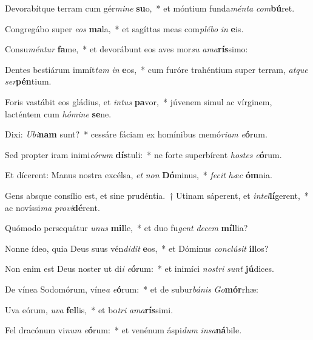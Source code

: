 \item Devorabítque terram cum gér\textit{mi}\textit{ne} \textbf{su}o,~* et móntium funda\textit{mén}\textit{ta} \textit{com}\textbf{bú}ret.
\item Congregábo super \textit{e}\textit{os} \textbf{ma}la,~* et sagíttas meas com\textit{plé}\textit{bo} \textit{in} \textbf{e}is.
\item Consu\textit{mén}\textit{tur} \textbf{fa}me,~* et devorábunt eos aves mor\textit{su} \textit{a}\textit{ma}\textbf{rís}simo:
\item Dentes bestiárum immít\textit{tam} \textit{in} \textbf{e}os,~* cum furóre trahéntium super terram, \textit{at}\textit{que} \textit{ser}\textbf{pén}tium.
\item Foris vastábit eos gládius, et \textit{in}\textit{tus} \textbf{pa}vor,~* júvenem simul ac vírginem, lacténtem cum \textit{hó}\textit{mi}\textit{ne} \textbf{se}ne.
\item Dixi: \textit{U}\textit{bi}\textbf{nam} sunt?~* cessáre fáciam ex homínibus memó\textit{ri}\textit{am} \textit{e}\textbf{ó}rum.
\item Sed propter iram inimi\textit{có}\textit{rum} \textbf{dís}tuli:~* ne forte superbírent \textit{hos}\textit{tes} \textit{e}\textbf{ó}rum.
\item Et dícerent: Manus nostra excélsa, \textit{et} \textit{non} \textbf{Dó}minus,~* \textit{fe}\textit{cit} \textit{hæc} \textbf{óm}nia.
\item Gens absque consílio est, et sine prudéntia.~† Utinam sáperent, et \textit{in}\textit{tel}\textbf{lí}gerent,~* ac novíssi\textit{ma} \textit{pro}\textit{vi}\textbf{dé}rent.
\item Quómodo persequátur \textit{u}\textit{nus} \textbf{mil}le,~* et duo fu\textit{gent} \textit{de}\textit{cem} \textbf{míl}lia?
\item Nonne ídeo, quia Deus suus vén\textit{di}\textit{dit} \textbf{e}os,~* et Dóminus \textit{con}\textit{clú}\textit{sit} \textbf{il}los?
\item Non enim est Deus noster ut di\textit{i} \textit{e}\textbf{ó}rum:~* et inimíci \textit{nos}\textit{tri} \textit{sunt} \textbf{jú}dices.
\item De vínea Sodomórum, víne\textit{a} \textit{e}\textbf{ó}rum:~* et de subur\textit{bá}\textit{nis} \textit{Go}\textbf{mór}rhæ:
\item Uva eórum, \textit{u}\textit{va} \textbf{fel}lis,~* et bo\textit{tri} \textit{a}\textit{ma}\textbf{rís}simi.
\item Fel dracónum vi\textit{num} \textit{e}\textbf{ó}rum:~* et venénum áspi\textit{dum} \textit{in}\textit{sa}\textbf{ná}bile.
